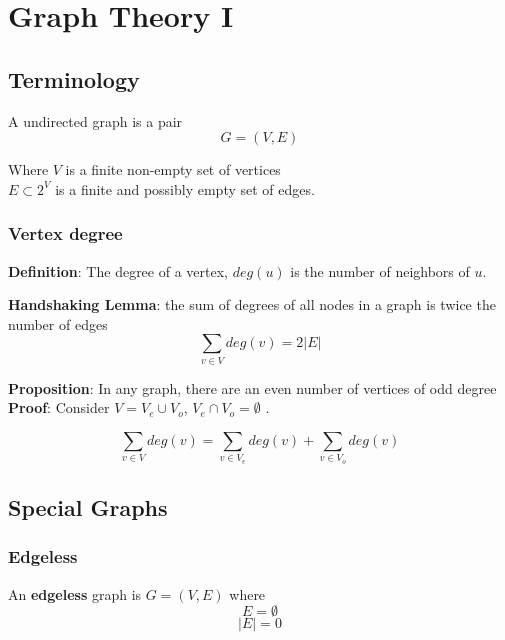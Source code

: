 \chapter{Graph Theory I}

\section{Terminology}
\begin{framed}
   A undirected graph is a pair 
   \[
     G = (V, E)
   \] 

   Where $V$ is a finite non-empty set of vertices \\

   $E \subset 2^V$ is a finite and possibly empty set of edges. 
\end{framed}

\subsection{Vertex degree}
\begin{framed}
   \textbf{Definition}: The degree of a vertex, $deg(u)$ is the number of neighbors of $u$. 
\end{framed}

\begin{framed}
   \textbf{Handshaking Lemma}: the sum of degrees of all nodes in a graph is twice the number of edges
   \[
      \sum_{v \in V} deg(v) = 2 |E|
   \] 
\end{framed}

\begin{framed}
   \textbf{Proposition}: In any graph, there are an even number of vertices of odd degree \\


   \textbf{Proof}: Consider $V = V_e \cup V_o$, $V_e \cap V_o = \emptyset$ . 

   \[
      \sum_{v \in V} deg(v) = \sum_{v \in V_e} deg(v) + \sum_{v \in V_o} deg(v)
   \] 
  
\end{framed}

\section{Special Graphs}

\subsection{Edgeless}
\begin{framed}
   An \textbf{edgeless } graph is $G = (V, E)$ where
   \[
     E = \emptyset
   \] 
   \[
     |E| = 0
   \] 
\end{framed}


